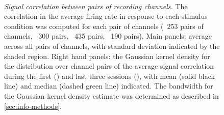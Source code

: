 \begin{figure}[htbp]%
    \centering
    \hspace*{\fill}
    \hspace*{\fill}\hspace{.2cm}\hspace*{\fill}
    \hspace*{\fill}
    \\
    \hspace*{\fill}
    \hspace*{\fill}\hspace{.2cm}\hspace*{\fill}
    \hspace*{\fill}
    \caption{\textit{Signal correlation between pairs of recording channels.}
The correlation in the average firing rate in response to each stimulus condition was computed for each pair of channels (\protect{}~\num{253} pairs of channels, \protect{}~\num{300} pairs, \protect{}~\num{435} pairs, \protect{}~\num{190} pairs).
Main panels: average across all pairs of channels, with standard deviation indicated by the shaded region.
Right hand panels: the Gaussian kernel density for the distribution over channel pairs of the average signal correlation during the first () and last three sessions (), with mean (solid black line) and median (dashed green line) indicated.
The bandwidth for the Gaussian kernel density estimate was determined as described in \autoref{sec:info-methods}.
}
    \label{fig:pl_sigcor}
\end{figure}



